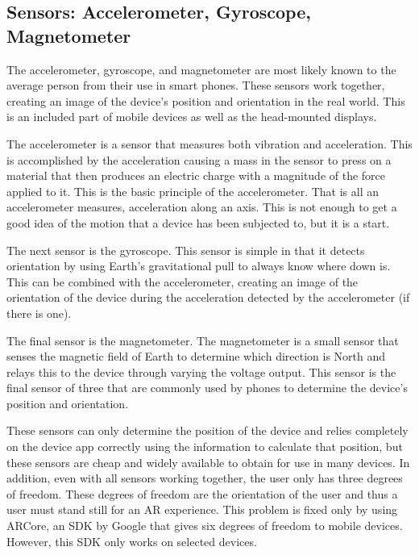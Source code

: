 \documentclass[10pt,draftclsnofoot,onecolumn,letterpaper]{IEEEtran}
\begin{document}
\subsection{Sensors: Accelerometer, Gyroscope, Magnetometer}
The accelerometer, gyroscope, and magnetometer are most likely known to the average person from their use in smart phones. These sensors work together, creating an image of the device's position and orientation in the real world. This is an included part of mobile devices as well as the head-mounted displays.\par
The accelerometer is a sensor that measures both vibration and acceleration. This is accomplished by the acceleration causing a mass in the sensor to press on a material that then produces an electric charge with a magnitude of the force applied to it. This is the basic principle of the accelerometer\cite{Accel}. That is all an accelerometer measures, acceleration along an axis. This is not enough to get a good idea of the motion that a device has been subjected to, but it is a start.\par
The next sensor is the gyroscope. This sensor is simple in that it detects orientation by using Earth's gravitational pull to always know where down is\cite{Gyro}. This can be combined with the accelerometer, creating an image of the orientation of the device during the acceleration detected by the accelerometer (if there is one).\par
The final sensor is the magnetometer. The magnetometer is a small sensor that senses the magnetic field of Earth to determine which direction is North and relays this to the device through varying the voltage output. This sensor is the final sensor of three that are commonly used by phones to determine the device's position and orientation\cite{PhoneSense}.\par
These sensors can only determine the position of the device and relies completely on the device app correctly using the information to calculate that position, but these sensors are cheap and widely available to obtain for use in many devices. In addition, even with all sensors working together, the user only has three degrees of freedom. These degrees of freedom are the orientation of the user and thus a user must stand still for an AR experience. This problem is fixed only by using ARCore, an SDK by Google that gives six degrees of freedom to mobile devices\cite{AR6dof}. However, this SDK only works on selected devices\cite{ARdev}.
\end{document}
